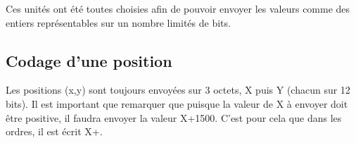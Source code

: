 \documentclass[a4paper, 12pt]{article}
\begin{document}
Ces unités ont été toutes choisies afin de pouvoir envoyer les valeurs comme des entiers représentables sur un nombre limités de bits.

\subsection{Codage d'une position}

Les positions (x,y) sont toujours envoyées sur 3 octets, X puis Y (chacun sur 12 bits). Il est important que remarquer que puisque la valeur de X à envoyer doit être positive, il faudra envoyer la valeur X+1500. C'est pour cela que dans les ordres, il est écrit X+.
\end{document}
